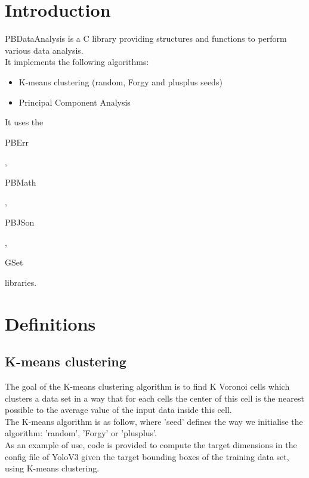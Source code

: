 \section*{Introduction}

PBDataAnalysis is a C library providing structures and functions to perform various data analysis.\\ 

It implements the following algorithms:
\begin{itemize}
\item K-means clustering (random, Forgy and plusplus seeds)
\item Principal Component Analysis
\end{itemize}

It uses the \begin{ttfamily}PBErr\end{ttfamily}, \begin{ttfamily}PBMath\end{ttfamily}, \begin{ttfamily}PBJSon\end{ttfamily}, \begin{ttfamily}GSet\end{ttfamily} libraries.\\

\section{Definitions}

\subsection{K-means clustering}

The goal of the K-means clustering algorithm is to find K Voronoi cells which clusters a data set in a way that for each cells the center of this cell is the nearest possible to the average value of the input data inside this cell.\\

The K-means algorithm is as follow, where 'seed' defines the way we initialise the algorithm: 'random', 'Forgy' or 'plusplus'.\\

As an example of use, code is provided to compute the target dimensions in the config file of YoloV3 given the target bounding boxes of the training data set, using K-means clustering.\\

\begin{scriptsize}
\begin{ttfamily}

\end{ttfamily}
\end{scriptsize}

